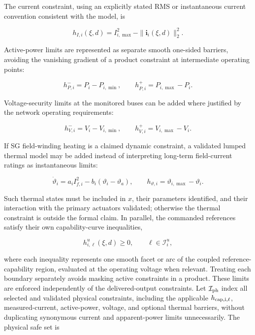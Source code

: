 \documentclass[11pt,twocolumn]{article}
\begin{document}
The current constraint, using an explicitly stated RMS or instantaneous current convention consistent with the model, is

\begin{equation}\label{eq:hi}
h_{I,i}(\xi,d)=I_{i,\max}^2-\|\bm i_i(\xi,d)\|_2^2.
\end{equation}

Active-power limits are represented as separate smooth one-sided barriers, avoiding the vanishing gradient of a product constraint at intermediate operating points:

\begin{equation}\label{eq:hp}
h_{P,i}^-=P_i-P_{i,\min},\qquad h_{P,i}^+=P_{i,\max}-P_i.
\end{equation}

Voltage-security limits at the monitored buses can be added where justified by the network operating requirements:

\begin{equation}\label{eq:hv}
h_{V,i}^{-}=V_i-V_{i,\min},\qquad
h_{V,i}^{+}=V_{i,\max}-V_i.
\end{equation}

If SG field-winding heating is a claimed dynamic constraint, a validated lumped thermal model may be added instead of interpreting long-term field-current ratings as instantaneous limits:

\begin{equation}\label{eq:thermal}
\dot\vartheta_i=a_i I_{f,i}^2-b_i(\vartheta_i-\vartheta_a),\qquad
h_{\vartheta,i}=\vartheta_{i,\max}-\vartheta_i.
\end{equation}

Such thermal states must be included in $x$, their parameters identified, and their interaction with the primary actuators validated; otherwise the thermal constraint is outside the formal claim. In parallel, the commanded references satisfy their own capability-curve inequalities,

\begin{equation}\label{eq:hu}
h^u_{i,\ell}(\xi,d)\geq0,\qquad \ell\in\mathcal I_i^u,
\end{equation}

where each inequality represents one smooth facet or arc of the coupled reference-capability region, evaluated at the operating voltage when relevant. Treating each boundary separately avoids masking active constraints in a product. These limits are enforced independently of the delivered-output constraints. Let $\mathcal I_{\rm ph}$ index all selected and validated physical constraints, including the applicable $h_{\rm cap,i,\ell}$, measured-current, active-power, voltage, and optional thermal barriers, without duplicating synonymous current and apparent-power limits unnecessarily. The physical safe set is
\end{document}
